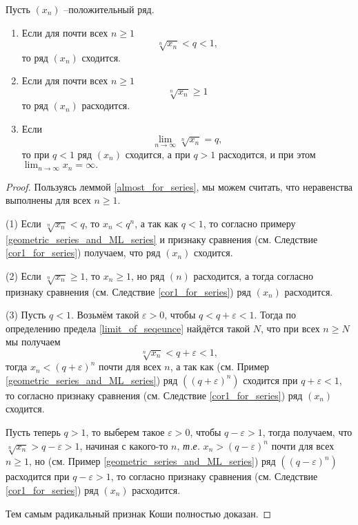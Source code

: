 \begin{theorem}
    Пусть $(x_n)$ --положительный ряд. 
    \begin{enumerate}
        \item Если для почти всех $n \ge 1$
        \[
         \sqrt[n]{x_n} < q < 1,
        \]
        то ряд $(x_n)$ сходится.
        
        \item Если для почти всех $n \ge 1$
        \[
         \sqrt[n]{x_n} \ge 1
        \]
        то ряд $(x_n)$ расходится.

        \item Если
        \[
         \lim_{n\to \infty } \sqrt[n]{x_n} = q,
        \]
        то при $q<1$ ряд $(x_n)$ сходится, а при $q>1$ расходится, и при этом $\lim_{n \to \infty} x_n = \infty.$
    \end{enumerate}
\end{theorem}

\begin{proof}
    Пользуясь леммой \ref{almost_for_series}, мы можем считать, что неравенства выполнены для всех $n \ge 1.$

    (1) Если $\sqrt[n]{x_n}<q$, то $x_n <q^n$, а так как $q<1$, то согласно примеру \ref{geometric_series_and_ML_series} и признаку сравнения (см. Следствие \ref{cor1_for_series}) получаем, что ряд $(x_n)$ сходится. 

    (2) Если $\sqrt[n]{x_n}\ge 1$, то $x_n \ge 1$, но ряд $(n)$ расходится, а тогда согласно признаку сравнения (см. Следствие \ref{cor1_for_series}) ряд $(x_n)$ расходится.

    (3) Пусть $q<1$. Возьмём такой $\varepsilon>0$, чтобы $q<q+\varepsilon <1$. Тогда по определению предела \ref{limit_of_seqeunce} найдётся такой $N$, что при всех $n \ge N$ мы получаем
    \[
     \sqrt[n]{x_n} < q+\varepsilon <1,
    \]
    тогда $x_n < (q+\varepsilon)^n$ почти для всех $n$, а так как (см. Пример \ref{geometric_series_and_ML_series}) ряд $((q+\varepsilon)^n)$ сходится при $q+\varepsilon<1$, то согласно признаку сравнения (см. Следствие \ref{cor1_for_series}) ряд $(x_n)$ сходится.

    Пусть теперь $q>1$, то выберем такое $\varepsilon>0$, чтобы $q-\varepsilon >1$, тогда получаем, что $\sqrt[n]{x_n} > q-\varepsilon >1$, начиная с какого-то $n$, \textit{т.е.} $x_n > (q-\varepsilon)^n$ почти для всех $n\ge 1$, но (см. Пример \ref{geometric_series_and_ML_series}) ряд $((q-\varepsilon)^n)$ расходится при $q-\varepsilon>1$, то согласно признаку сравнения (см. Следствие \ref{cor1_for_series}) ряд $(x_n)$ расходится.

    Тем самым радикальный признак Коши полностью доказан.
\end{proof}

